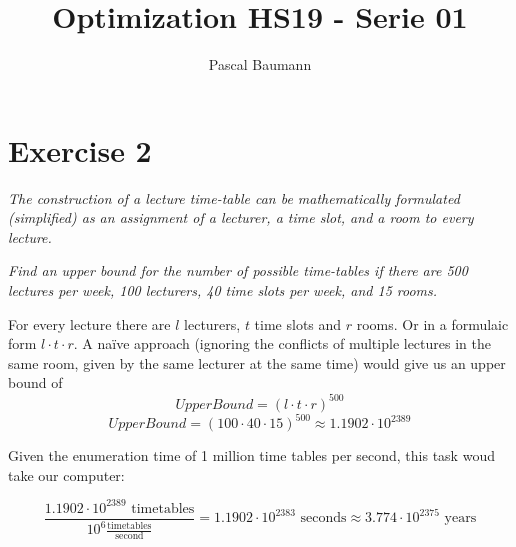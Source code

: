\documentclass[11pt]{article}
\begin{document}
\title{Optimization HS19 - Serie 01}
\author{Pascal Baumann}
\maketitle

\graphicspath{{./img/}}

\section{Exercise 2}
\textit{The construction of a lecture time-table can be mathematically formulated (simplified) as an assignment of a lecturer, a time slot, and a room to every lecture.}

\textit{Find an upper bound for the number of possible time-tables if there are 500 lectures per week, 100 lecturers, 40 time slots per week, and 15 rooms.}

\vspace{1em}

For every lecture there are $l$ lecturers, $t$ time slots and $r$ rooms. Or in a formulaic form $l\cdot t\cdot r$. A naïve approach (ignoring the conflicts of multiple lectures in the same room, given by the same lecturer at the same time) would give us an upper bound of
\begin{equation*}
    UpperBound = (l\cdot t \cdot r)^{500}
\end{equation*}
\begin{equation*}
    UpperBound = (100\cdot 40\cdot 15)^{500} \approx 1.1902\cdot 10^{2389} 
\end{equation*}

Given the enumeration time of 1 million time tables per second, this task woud take our computer:

\begin{equation*}
    \frac{1.1902\cdot 10^{2389}\text{ timetables}}{10^6\frac{\text{timetables}}{\text{second}}} = 1.1902\cdot 10^{2383}\text{ seconds} \approx 3.774\cdot 10^{2375}\text{ years}
\end{equation*}
\end{document}
